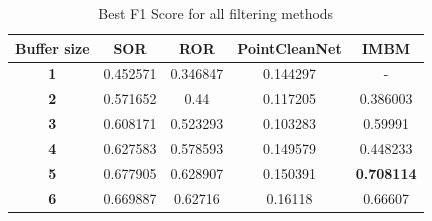 \begin{table}[H]
	\caption{\label{tab:final_comp} Best F1 Score for all filtering methods }
	\centering
	\begin{tabular}{ccccc}
		\toprule
		\textbf{Buffer size} & \textbf{SOR} & \textbf{ROR} & \textbf{PointCleanNet} & \textbf{IMBM}     \\ 
		\midrule
		\textbf{1}           & 0.452571     & 0.346847     & 0.144297               & -                 \\ 
		\textbf{2}           & 0.571652     & 0.44         & 0.117205               & 0.386003          \\ 
		\textbf{3}           & 0.608171     & 0.523293     & 0.103283               & 0.59991           \\ 
		\textbf{4}           & 0.627583     & 0.578593     & 0.149579               & 0.448233          \\ 
		\textbf{5}           & 0.677905     & 0.628907     & 0.150391               & \textbf{0.708114} \\ 
		\textbf{6}           & 0.669887     & 0.62716      & 0.16118                & 0.66607           \\ 
		\bottomrule
	\end{tabular}
\end{table}

